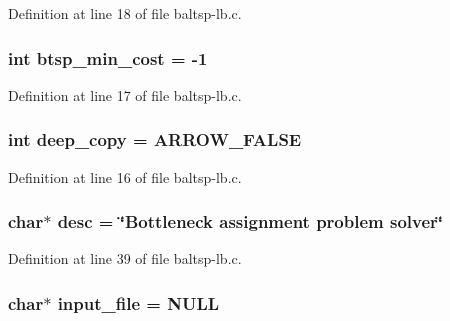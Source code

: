 Definition at line 18 of file baltsp-lb.c.\hypertarget{bin_2baltsp-lb_8c_97987334c96a847ff74c2c6c83d78a73}{
\subsubsection[{btsp\_\-min\_\-cost}]{\setlength{\rightskip}{0pt plus 5cm}int {\bf btsp\_\-min\_\-cost} = -1}}
\label{bin_2baltsp-lb_8c_97987334c96a847ff74c2c6c83d78a73}




Definition at line 17 of file baltsp-lb.c.\hypertarget{bin_2baltsp-lb_8c_7298da576a5b127d04b4c46b3bc78821}{
\subsubsection[{deep\_\-copy}]{\setlength{\rightskip}{0pt plus 5cm}int {\bf deep\_\-copy} = ARROW\_\-FALSE}}
\label{bin_2baltsp-lb_8c_7298da576a5b127d04b4c46b3bc78821}




Definition at line 16 of file baltsp-lb.c.\hypertarget{bin_2baltsp-lb_8c_3aad16fd4bea1b9717f232ea75ad6449}{
\subsubsection[{desc}]{\setlength{\rightskip}{0pt plus 5cm}char$\ast$ {\bf desc} = \char`\"{}Bottleneck assignment problem solver\char`\"{}}}
\label{bin_2baltsp-lb_8c_3aad16fd4bea1b9717f232ea75ad6449}




Definition at line 39 of file baltsp-lb.c.\hypertarget{bin_2baltsp-lb_8c_a4f3a15de34c409bdec6ceacf93078ed}{
\subsubsection[{input\_\-file}]{\setlength{\rightskip}{0pt plus 5cm}char$\ast$ {\bf input\_\-file} = NULL}}
\label{bin_2baltsp-lb_8c_a4f3a15de34c409bdec6ceacf93078ed}


